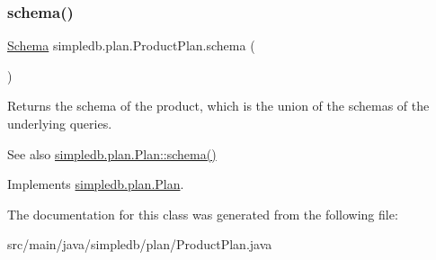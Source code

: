 \mbox{\label{classsimpledb_1_1plan_1_1ProductPlan_aefae6a42767a872bc50882b415a9f76c}} 
\subsubsection{\texorpdfstring{schema()}{schema()}}
{\footnotesize\ttfamily \hyperlink{classsimpledb_1_1record_1_1Schema}{Schema} simpledb.\+plan.\+Product\+Plan.\+schema (\begin{DoxyParamCaption}{ }\end{DoxyParamCaption})\hspace{0.3cm}{\ttfamily [inline]}}

Returns the schema of the product, which is the union of the schemas of the underlying queries. \begin{DoxySeeAlso}{See also}
\hyperlink{interfacesimpledb_1_1plan_1_1Plan_ad0ee1aa2c4e7147e9f8fc6f3301fa986}{simpledb.\+plan.\+Plan\+::schema()} 
\end{DoxySeeAlso}


Implements \hyperlink{interfacesimpledb_1_1plan_1_1Plan_ad0ee1aa2c4e7147e9f8fc6f3301fa986}{simpledb.\+plan.\+Plan}.



The documentation for this class was generated from the following file\+:\begin{DoxyCompactItemize}
\item 
src/main/java/simpledb/plan/Product\+Plan.\+java\end{DoxyCompactItemize}
